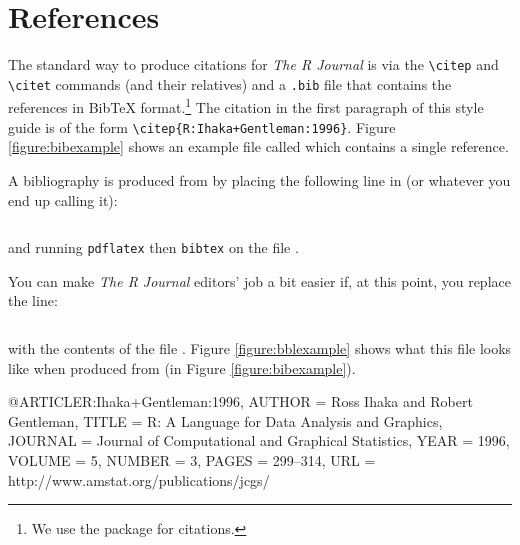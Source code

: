\section{References}

The standard way to produce citations for \emph{The R Journal} is via the
\verb|\citep| and \verb|\citet| commands (and their relatives)
and a {\tt .bib} file that contains the
references in {\sc Bib}\TeX{} format.\footnote{We use the 
package for citations.}  The citation in the first
paragraph of this style guide is of the form
\verb|\citep{R:Ihaka+Gentleman:1996}|.  Figure \ref{figure:bibexample}
shows an example file called  which contains
a single reference.

A bibliography is produced from 
by placing the following line in  (or
whatever you end up calling it):
\begin{verbatim}

\end{verbatim}
and running {\tt pdflatex} then {\tt bibtex} on the file
.

You can make \emph{The R Journal} editors' job a bit easier if, at this point,
you replace the line:
\begin{verbatim}

\end{verbatim}
with the contents of the file .  Figure
\ref{figure:bblexample} shows what this  file
looks like when produced from 
(in Figure \ref{figure:bibexample}).

\begin{figure*}[b]
\begin{center}
\begin{boxedverbatim}
@ARTICLE{R:Ihaka+Gentleman:1996,
  AUTHOR = {Ross Ihaka and Robert Gentleman},
  TITLE = {R: A Language for Data Analysis and Graphics},
  JOURNAL = {Journal of Computational and Graphical Statistics},
  YEAR = 1996,
  VOLUME = 5,
  NUMBER = 3,
  PAGES = {299--314},
  URL = {http://www.amstat.org/publications/jcgs/}
}
\end{boxedverbatim}
\end{center}
\caption{\label{figure:bibexample}
The contents of a file called .  This figure
uses the {\tt figure*} environment to span
two columns.}
\end{figure*}

